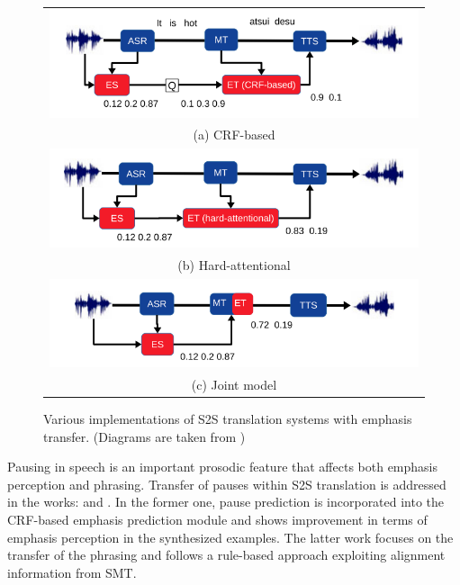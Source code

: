 \begin{figure}
\centering
\begin{tabular}{c}
  \includegraphics[width=0.7\linewidth]{img/quoc_a.png} \\
(a) CRF-based \\[6pt]
 \includegraphics[width=0.7\linewidth]{img/quoc_b.png} \\
(b) Hard-attentional \\[6pt]
 \includegraphics[width=0.7\linewidth]{img/quoc_c.png} \\
(c) Joint model \\[6pt]
\end{tabular}
\caption[Various implementations of S2S translation systems with emphasis transfer.]{Various implementations of S2S translation systems with emphasis transfer. (Diagrams are taken from \cite{Quoc2018}) }
\label{sota:quoc}
\end{figure}

Pausing in speech is an important prosodic feature that affects both emphasis perception and phrasing. Transfer of pauses within S2S translation is addressed in the works: \cite{truong2015_iwslt} and \cite{bonafonte:pausetransfer}. In the former one, pause prediction is incorporated into the CRF-based emphasis prediction module and shows improvement in terms of emphasis perception in the synthesized examples. The latter work focuses on the transfer of the phrasing and follows a rule-based approach exploiting alignment information from SMT. 

